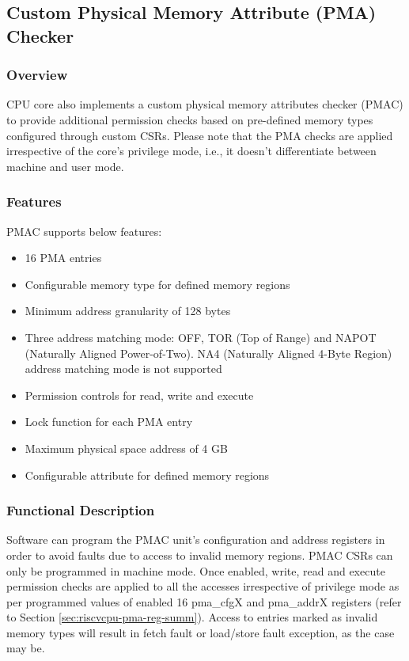 \documentclass[main\_\_EN.tex]{subfiles}
\begin{document}
\newpage
\subsection{Custom Physical Memory Attribute (PMA) Checker}
\label{sec:riscvcpu-pma}
\subsubsection{Overview}
\label{sec:riscvcpu-pma-overview}
CPU core also implements a custom physical memory attributes checker (PMAC) to provide additional permission checks based on pre-defined memory types configured through custom CSRs. Please note that the PMA checks are applied irrespective of the core's privilege mode, i.e., it doesn't differentiate between machine and user mode.


\subsubsection{Features}
\label{sec:riscvcpu-pma-features}

PMAC supports below features:

\begin{itemize}
    \item 16 PMA entries
    \item Configurable memory type for defined memory regions
    \item Minimum address granularity of 128 bytes
    \item Three address matching mode: OFF, TOR (Top of Range) and NAPOT (Naturally Aligned Power-of-Two). NA4 (Naturally Aligned 4-Byte Region) address matching mode is not supported
    \item Permission controls for read, write and execute
    \item Lock function for each PMA entry
    \item Maximum physical space address of 4 GB
    \item Configurable attribute for defined memory regions
\end{itemize}

\subsubsection{Functional Description}
\label{sec:riscvcpu-pma-func-descr}

Software can program the PMAC unit's configuration and address registers in order to avoid faults due to access to invalid memory regions. PMAC CSRs can only be programmed in machine mode. Once enabled, write, read and execute permission checks are applied to all the accesses irrespective of privilege mode as per programmed values of enabled 16 pma\_cfgX and pma\_addrX registers (refer to Section \ref{sec:riscvcpu-pma-reg-summ}). Access to entries marked as invalid memory types will result in fetch fault or load/store fault exception, as the case may be.
\end{document}
